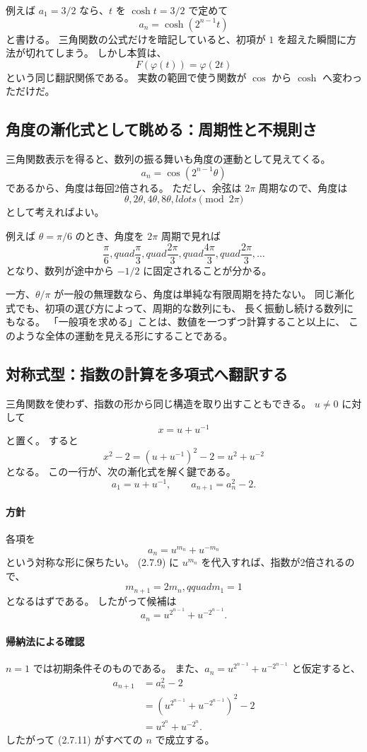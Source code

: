 例えば $a_1=3/2$ なら、$t$ を $\cosh t=3/2$ で定めて
\[
  a_n=\cosh(2^{n-1}t)
\]
と書ける。
三角関数の公式だけを暗記していると、初項が $1$ を超えた瞬間に方法が切れてしまう。
しかし本質は、
\[
  F(\varphi(t))=\varphi(2t)
\]
という同じ翻訳関係である。
実数の範囲で使う関数が $\cos$ から $\cosh$ へ変わっただけだ。

\subsection{角度の漸化式として眺める：周期性と不規則さ}

三角関数表示を得ると、数列の振る舞いも角度の運動として見えてくる。
\[
  a_n=\cos\left(2^{n-1}\theta\right)
\]
であるから、角度は毎回2倍される。
ただし、余弦は $2\pi$ 周期なので、角度は
\[
  \theta, 2\theta, 4\theta, 8\theta,ldots
  \pmod{2\pi}
\]
として考えればよい。

例えば $\theta=\pi/6$ のとき、角度を $2\pi$ 周期で見れば
\[
  \frac{\pi}{6},quad
  \frac{\pi}{3},quad
  \frac{2\pi}{3},quad
  \frac{4\pi}{3},quad
  \frac{2\pi}{3},\ldots
\]
となり、数列が途中から $-1/2$ に固定されることが分かる。

一方、$\theta/\pi$ が一般の無理数なら、角度は単純な有限周期を持たない。
同じ漸化式でも、初項の選び方によって、周期的な数列にも、
長く振動し続ける数列にもなる。
「一般項を求める」ことは、数値を一つずつ計算すること以上に、
このような全体の運動を見える形にすることである。

\subsection{対称式型：指数の計算を多項式へ翻訳する}

三角関数を使わず、指数の形から同じ構造を取り出すこともできる。
$u\neq0$ に対して
\[
  x=u+u^{-1}
\]
と置く。
すると
\[
  x^2-2
    =(u+u^{-1})^2-2
    =u^2+u^{-2}
  \tag{2.7.9}
\]
となる。
この一行が、次の漸化式を解く鍵である。
\[
  a_1=u+u^{-1},
  \qquad
  a_{n+1}=a_n^2-2 .
  \tag{2.7.10}
\]

\paragraph{方針}
各項を
\[
  a_n=u^{m_n}+u^{-m_n}
\]
という対称な形に保ちたい。
(2.7.9) に $u^{m_n}$ を代入すれば、指数が2倍されるので、
\[
  m_{n+1}=2m_n,qquad m_1=1
\]
となるはずである。
したがって候補は
\[
  a_n=u^{2^{n-1}}+u^{-2^{n-1}} .
  \tag{2.7.11}
\]

\paragraph{帰納法による確認}
$n=1$ では初期条件そのものである。
また、$a_n=u^{2^{n-1}}+u^{-2^{n-1}}$ と仮定すると、
\begin{align*}
  a_{n+1}
    &=a_n^2-2\\
    &=\left(u^{2^{n-1}}+u^{-2^{n-1}}\right)^2-2\\
    &=u^{2^n}+u^{-2^n}.
\end{align*}
したがって (2.7.11) がすべての $n$ で成立する。

